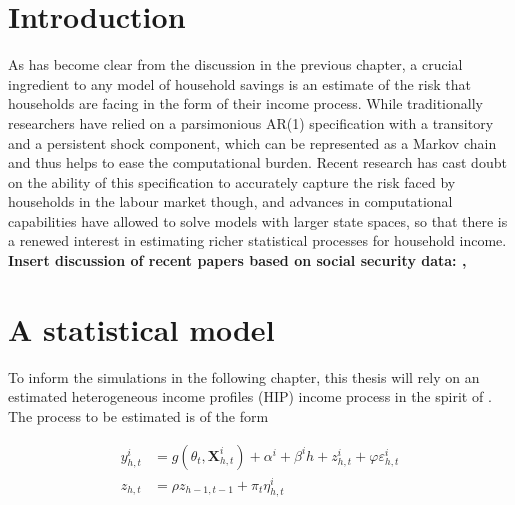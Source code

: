 \section{Introduction}
As has become clear from the discussion in the previous chapter, a crucial 
ingredient to any model of household savings is an estimate of the risk that
households are facing in the form of their income process. While traditionally
researchers have relied on a parsimonious AR(1) specification with a transitory
and a persistent shock component, which can be represented as a Markov chain 
and thus helps to ease the computational burden. Recent research has cast doubt 
on the ability of this specification to accurately capture the risk faced by 
households in the labour market though, and advances in computational 
capabilities have allowed to solve models with larger state spaces, so that 
there is a renewed interest in estimating richer statistical processes for 
household income. \vspace{1cm}
\\
\textbf{Insert discussion of recent papers based on social security data:
\citet{GKOS2015}, \citet{DHPRV2013}}

\section{A statistical model}
To inform the simulations in the following chapter, this thesis will rely on an
estimated heterogeneous income profiles (HIP) income process in the spirit of
\citet{Guvenen2009}. The process to be estimated is of the form

\begin{align}
y_{h,t}^i &= g(\theta_t, \pmb{X}_{h,t}^i) + \alpha^i + \beta^i h + z_{h,t}^i + \varphi \varepsilon_{h,t}^i \label{incproc} \\ 
z_{h,t} &= \rho z_{h-1,t-1} + \pi_t \eta_{h,t}^i \label{persshock}
\end{align}

